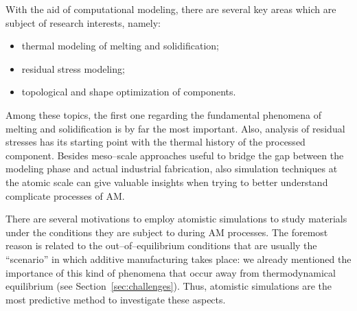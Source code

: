 With the aid of computational modeling, there are several key areas which are subject of research interests, namely:
\begin{itemize}
    \item thermal modeling of melting and solidification;
    \item residual stress modeling;
    \item topological and shape optimization of components.
\end{itemize}

Among these topics, the first one regarding the fundamental phenomena of melting and solidification is by far the most important. Also, analysis of residual stresses has its starting point with the thermal history of the processed component.
Besides meso--scale approaches useful to bridge the gap between the modeling phase and actual industrial fabrication, also simulation techniques at the atomic scale can give valuable insights when trying to better understand complicate processes of AM.

There are several motivations to employ atomistic simulations to study materials under the conditions they are subject to during AM processes. The foremost reason is related to the out--of--equilibrium conditions that are usually the ``scenario'' in which additive manufacturing takes place: we already mentioned the importance of this kind of phenomena that occur away from thermodynamical equilibrium (see Section~\ref{sec:challenges}). Thus, atomistic simulations are the most predictive method to investigate these aspects.


